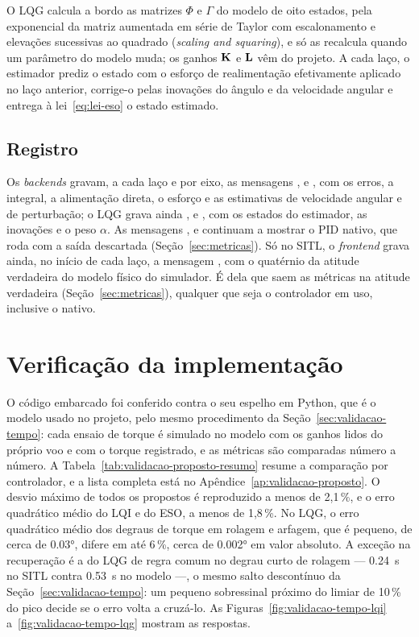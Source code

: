 O LQG calcula a bordo as matrizes $\Phi$ e $\Gamma$
do modelo de oito estados, pela exponencial da matriz aumentada em série de
Taylor com escalonamento e elevações sucessivas ao quadrado (\textit{scaling
and squaring}), e só as recalcula quando um parâmetro do
modelo muda; os ganhos $\mathbf{K}$ e $\mathbf{L}$ vêm do projeto. A cada
laço, o estimador prediz o estado com o esforço de realimentação efetivamente
aplicado no laço anterior, corrige-o pelas inovações do ângulo e da
velocidade angular e entrega à lei~\eqref{eq:lei-eso} o estado estimado.

\subsection{Registro}

Os \textit{backends} gravam, a cada laço e por eixo, as
mensagens ,  e , com os erros, a
integral, a alimentação direta, o esforço e as estimativas de velocidade
angular e de perturbação; o LQG grava ainda ,  e
, com os estados do estimador, as inovações e o peso $\alpha$.
As mensagens ,  e  continuam a mostrar
o PID nativo, que roda com a saída descartada (Seção~\ref{sec:metricas}).
Só no SITL, o \textit{frontend} grava ainda, no início de cada laço, a
mensagem , com o quatérnio da atitude verdadeira do modelo
físico do simulador. É dela que saem as métricas na atitude verdadeira
(Seção~\ref{sec:metricas}), qualquer que seja o controlador em uso, inclusive
o nativo.

\section{Verificação da implementação}
\label{sec:verificacao-implementacao}

O código embarcado foi conferido contra o seu espelho em Python, que é o
modelo usado no projeto, pelo mesmo procedimento da
Seção~\ref{sec:validacao-tempo}: cada ensaio de torque é simulado no modelo
com os ganhos lidos do próprio voo e com o torque registrado, e as métricas
são comparadas número a número. A Tabela~\ref{tab:validacao-proposto-resumo}
resume a comparação por controlador, e a lista completa está no
Apêndice~\ref{ap:validacao-proposto}. O desvio máximo de todos os propostos
é reproduzido a menos de 2,1\,\%, e o erro quadrático médio do LQI e do ESO,
a menos de 1,8\,\%. No LQG, o erro quadrático médio dos degraus de torque em
rolagem e arfagem, que é pequeno, de cerca de \ang{0.03}, difere em até
6\,\%, cerca de \ang{0.002} em valor absoluto. A exceção na recuperação é a
do LQG de regra comum no degrau curto de rolagem --- \SI{0.24}{\second} no
SITL contra \SI{0.53}{\second} no modelo ---, o mesmo salto descontínuo da
Seção~\ref{sec:validacao-tempo}: um pequeno sobressinal próximo do limiar de
10\,\% do pico decide se o erro volta a cruzá-lo. As
Figuras~\ref{fig:validacao-tempo-lqi} a~\ref{fig:validacao-tempo-lqg}
mostram as respostas.

